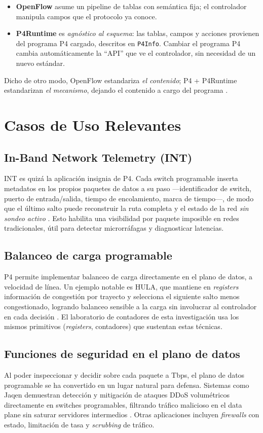 \documentclass[conference,onecolumn,10pt]{IEEEtran}
\begin{document}
\begin{itemize}
\item \textbf{OpenFlow} asume un pipeline de tablas con semántica fija; el
controlador manipula campos que el protocolo ya conoce.
\item \textbf{P4Runtime} es \emph{agnóstico al esquema}: las tablas, campos y
acciones provienen del programa P4 cargado, descritos en \texttt{P4Info}. Cambiar
el programa P4 cambia automáticamente la ``API'' que ve el controlador, sin
necesidad de un nuevo estándar.
\end{itemize}

Dicho de otro modo, OpenFlow estandariza \emph{el contenido}; P4 + P4Runtime
estandarizan \emph{el mecanismo}, dejando el contenido a cargo del programa
\cite{bosshart2014p4, p4runtime}.

\section{Casos de Uso Relevantes}

\subsection{In-Band Network Telemetry (INT)}
INT es quizá la aplicación insignia de P4. Cada switch programable inserta
metadatos en los propios paquetes de datos a su paso —identificador de switch,
puerto de entrada/salida, tiempo de encolamiento, marca de tiempo—, de modo que
el último salto puede reconstruir la ruta completa y el estado de la red
\emph{sin sondeo activo} \cite{int_spec}. Esto habilita una visibilidad por
paquete imposible en redes tradicionales, útil para detectar microrráfagas y
diagnosticar latencias.

\subsection{Balanceo de carga programable}
P4 permite implementar balanceo de carga directamente en el plano de datos, a
velocidad de línea. Un ejemplo notable es HULA, que mantiene en \emph{registers}
información de congestión por trayecto y selecciona el siguiente salto menos
congestionado, logrando balanceo sensible a la carga sin involucrar al
controlador en cada decisión \cite{katta2016hula}. El laboratorio de contadores
de esta investigación usa los mismos primitivos (\emph{registers}, contadores)
que sustentan estas técnicas.

\subsection{Funciones de seguridad en el plano de datos}
Al poder inspeccionar y decidir sobre cada paquete a Tbps, el plano de datos
programable se ha convertido en un lugar natural para defensa. Sistemas como
Jaqen demuestran detección y mitigación de ataques DDoS volumétricos
directamente en switches programables, filtrando tráfico malicioso en el data
plane sin saturar servidores intermedios \cite{liu2021jaqen}. Otras aplicaciones
incluyen \emph{firewalls} con estado, limitación de tasa y \emph{scrubbing} de
tráfico.
\end{document}

